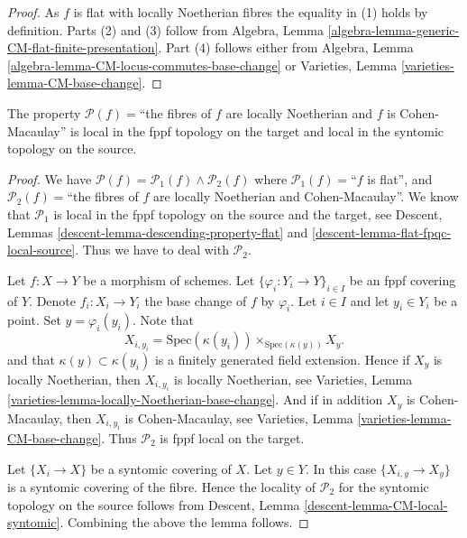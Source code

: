 \begin{proof}
As $f$ is flat with locally Noetherian fibres the equality in (1) holds
by definition. Parts (2) and (3) follow from
Algebra, Lemma \ref{algebra-lemma-generic-CM-flat-finite-presentation}.
Part (4) follows either from
Algebra, Lemma \ref{algebra-lemma-CM-locus-commutes-base-change}
or
Varieties, Lemma \ref{varieties-lemma-CM-base-change}.
\end{proof}

\begin{lemma}
\label{lemma-CM-local-source-and-target}
The property
$\mathcal{P}(f)=$``the fibres of $f$ are locally Noetherian and $f$ is
Cohen-Macaulay'' is local in the fppf topology on the target and
local in the syntomic topology on the source.
\end{lemma}

\begin{proof}
We have
$\mathcal{P}(f) =
\mathcal{P}_1(f) \wedge \mathcal{P}_2(f)$
where
$\mathcal{P}_1(f)=$``$f$ is flat'', and
$\mathcal{P}_2(f)=$``the fibres of $f$ are locally Noetherian
and Cohen-Macaulay''.
We know that $\mathcal{P}_1$ is
local in the fppf topology on the source and the target, see
Descent, Lemmas \ref{descent-lemma-descending-property-flat} and
\ref{descent-lemma-flat-fpqc-local-source}. Thus we have to deal
with $\mathcal{P}_2$.

\medskip\noindent
Let $f : X \to Y$ be a morphism of schemes.
Let $\{\varphi_i : Y_i \to Y\}_{i \in I}$ be an fppf covering of $Y$.
Denote $f_i : X_i \to Y_i$ the base change of $f$ by $\varphi_i$.
Let $i \in I$ and let $y_i \in Y_i$ be a point.
Set $y = \varphi_i(y_i)$. Note that
$$
X_{i, y_i} = \text{Spec}(\kappa(y_i)) \times_{\text{Spec}(\kappa(y))} X_y.
$$
and that $\kappa(y) \subset \kappa(y_i)$ is a finitely generated field
extension. Hence if $X_y$ is locally Noetherian, then
$X_{i, y_i}$ is locally Noetherian, see
Varieties, Lemma \ref{varieties-lemma-locally-Noetherian-base-change}.
And if in addition $X_y$ is Cohen-Macaulay,
then $X_{i, y_i}$ is Cohen-Macaulay, see
Varieties, Lemma \ref{varieties-lemma-CM-base-change}.
Thus $\mathcal{P}_2$ is fppf local on the target.

\medskip\noindent
Let $\{X_i \to X\}$ be a syntomic covering of $X$.
Let $y \in Y$. In this case $\{X_{i, y} \to X_y\}$ is a
syntomic covering of the fibre. Hence the locality of $\mathcal{P}_2$
for the syntomic topology on the source follows from
Descent, Lemma \ref{descent-lemma-CM-local-syntomic}.
Combining the above the lemma follows.
\end{proof}










